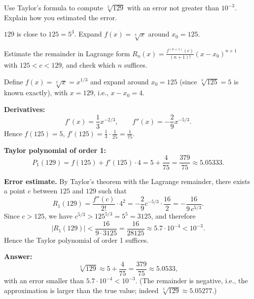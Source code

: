 
\begin{question}
Use Taylor's formula to compute $\sqrt[3]{129}$ with an error not greater than $10^{-3}$.
Explain how you estimated the error.
\end{question}

\begin{hint}
$129$ is close to $125=5^3$. Expand $f(x)=\sqrt[3]{x}$ around $x_0=125$.
\end{hint}

\begin{hint}
Estimate the remainder in Lagrange form $R_n(x)=\frac{f^{(n+1)}(c)}{(n+1)!}(x-x_0)^{n+1}$ with $125<c<129$, and check which $n$ suffices.
\end{hint}

\begin{solution}
Define $f(x)=\sqrt[3]{x}=x^{1/3}$ and expand around $x_0=125$ (since $\sqrt[3]{125}=5$ is known exactly), with $x=129$, i.e., $x-x_0=4$.

\textbf{Derivatives:}
\[
f'(x)=\frac13 x^{-2/3},\qquad f''(x)=-\frac29 x^{-5/3}.
\]
Hence $f(125)=5$, $f'(125)=\frac13\cdot\frac{1}{25}=\frac{1}{75}$.

\textbf{Taylor polynomial of order 1:}
\[
P_1(129)=f(125)+f'(125)\cdot 4=5+\frac{4}{75}=\frac{379}{75}\approx 5.05333.
\]

\textbf{Error estimate.} By Taylor's theorem with the Lagrange remainder, there exists a point $c$ between $125$ and $129$ such that
\[
R_1(129)=\frac{f''(c)}{2!}\cdot 4^2=-\frac{2}{9}c^{-5/3}\cdot\frac{16}{2}=-\frac{16}{9\,c^{5/3}}.
\]
Since $c>125$, we have $c^{5/3}>125^{5/3}=5^5=3125$, and therefore
\[
|R_1(129)|<\frac{16}{9\cdot 3125}=\frac{16}{28125}\approx 5.7\cdot 10^{-4}<10^{-3}.
\]
Hence the Taylor polynomial of order 1 suffices.

\textbf{Answer:}
\[
\sqrt[3]{129}\approx 5+\frac{4}{75}=\frac{379}{75}\approx 5.0533,
\]
with an error smaller than $5.7\cdot10^{-4}<10^{-3}$. (The remainder is negative, i.e., the approximation is larger than the true value; indeed $\sqrt[3]{129}\approx 5.05277$.)
\end{solution}
